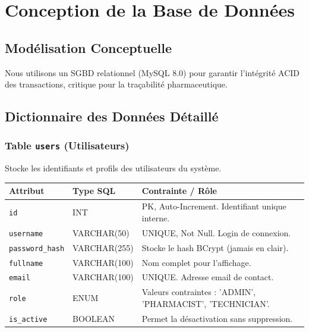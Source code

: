\documentclass[12pt, a4paper]{report}
\begin{document}
\chapter{Conception de la Base de Données}

\section{Modélisation Conceptuelle}
Nous utilisons un SGBD relationnel (MySQL 8.0) pour garantir l'intégrité ACID des transactions, critique pour la traçabilité pharmaceutique.

\section{Dictionnaire des Données Détaillé}

\subsection{Table \texttt{users} (Utilisateurs)}
Stocke les identifiants et profils des utilisateurs du système.
\begin{longtable}{|p{3cm}|p{2.5cm}|p{8cm}|}
\hline
\textbf{Attribut} & \textbf{Type SQL} & \textbf{Contrainte / Rôle} \\
\hline
\texttt{id} & INT & PK, Auto-Increment. Identifiant unique interne. \\
\hline
\texttt{username} & VARCHAR(50) & UNIQUE, Not Null. Login de connexion. \\
\hline
\texttt{password\_hash} & VARCHAR(255) & Stocke le hash BCrypt (jamais en clair). \\
\hline
\texttt{fullname} & VARCHAR(100) & Nom complet pour l'affichage. \\
\hline
\texttt{email} & VARCHAR(100) & UNIQUE. Adresse email de contact. \\
\hline
\texttt{role} & ENUM & Valeurs contraintes : 'ADMIN', 'PHARMACIST', 'TECHNICIAN'. \\
\hline
\texttt{is\_active} & BOOLEAN & Permet la désactivation sans suppression. \\
\hline
\end{longtable}
\end{document}
